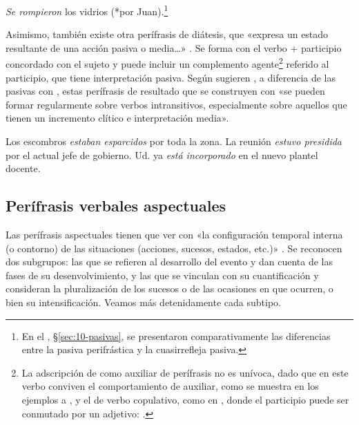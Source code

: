 \begin{exe}
  \ex \textit{Se rompieron} los vidrios (*por Juan).\footnote{En el ,
      §\ref{sec:10-pasivas}, se presentaron comparativamente las diferencias
      entre la pasiva perifrástica y la cuasirrefleja pasiva.}
\end{exe}

Asimismo, también existe otra perífrasis de diátesis, que «expresa un estado
resultante de una acción pasiva o media\ldots» \parencite[3429]{yllera1999}. Se
forma con el verbo  + participio concordado con el sujeto y puede
incluir un complemento agente\footnote{La adscripción de  como
auxiliar de perífrasis no es unívoca, dado que en este verbo conviven el
comportamiento de auxiliar, como se muestra en los ejemplos
 a , y el de verbo copulativo, como
en , donde el participio puede
ser conmutado por un adjetivo: .} referido al participio, que tiene interpretación pasiva. Según sugieren
\textcite[105]{garciafernandez2019}, a diferencia de las pasivas con
, estas perífrasis de resultado que se construyen con 
«se pueden formar regularmente sobre verbos intransitivos, especialmente sobre
aquellos que tienen un incremento clítico e interpretación
media».

\begin{exe}
  \ex\label{ex:11-escombros} Los escombros \textit{estaban esparcidos} por toda
      la zona.
  \ex La reunión \textit{estuvo presidida} por el actual jefe de gobierno.
  \ex\label{ex:11-plantel} Ud. ya \textit{está incorporado} en el nuevo plantel
      docente.
\end{exe}

\subsection{Perífrasis verbales aspectuales}\label{sec:11-aspectuales}

Las perífrasis aspectuales tienen que ver con «la configuración temporal interna
(o contorno) de las situaciones (acciones, sucesos, estados, etc.)»
\parencite[346]{lyons1997}. Se reconocen dos subgrupos: las que se refieren al
desarrollo del evento y dan cuenta de las fases de su desenvolvimiento, y las que
se vinculan con su cuantificación y consideran la pluralización de los sucesos o
de las ocasiones en que ocurren, o bien su intensificación. Veamos más
detenidamente cada subtipo.

